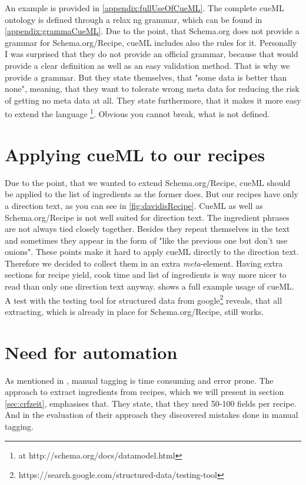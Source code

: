 \documentclass[12pt, twoside]{report}
\begin{document}
An example is provided in \cref{appendix:fullUseOfCueML}. The complete cueML ontology is defined through a relax ng grammar, which can be found in \cref{appendix:grammaCueML}. Due to the point, that Schema.org does not provide a grammar for Schema.org/Recipe, cueML includes also the rules for it. Personally I was surprised that they do not provide an official grammar, because that would provide a clear definition as well as an easy validation method. That is why we provide a grammar. But they state themselves, that "some data is better than none", meaning, that they want to tolerate wrong meta data for reducing the risk of getting no meta data at all. They state furthermore, that it makes it more easy to extend the language \parencite{schemaOrg}\footnote{at http://schema.org/docs/datamodel.html}. Obvious you cannot break, what is not defined. 


\section{Applying cueML to our recipes}
Due to the point, that we wanted to extend Schema.org/Recipe, cueML should be applied to the list of ingredients as the former does. But our recipes have only a direction text, as you can see in \cref{fig:davidisRecipe}. CueML as well as Schema.org/Recipe is not well suited for direction text. The ingredient phrases are not always tied closely together. Besides they repeat themselves in the text and sometimes they appear in the form of "like the previous one but don't use onions". These points make it hard to apply cueML directly to the direction text. Therefore we decided to collect them in an extra \textit{meta}-element. Having extra sections for recipe yield, cook time and list of ingredients is way more nicer to read than only one direction text anyway.  shows a full example usage of cueML. A test with the testing tool for structured data from google\footnote{https://search.google.com/structured-data/testing-tool} reveals, that all extracting, which is already in place for Schema.org/Recipe, still works. 


\section{Need for automation}
As mentioned in \parencite{manualTagging}, manual tagging is time consuming and error prone. The approach to extract ingredients from recipes, which we will present in section \ref{sec:crfzeit}, emphasises that. They state, that they need 50-100 fields per recipe. And in the evaluation of their approach they discovered mistakes done in manual tagging.
\end{document}
